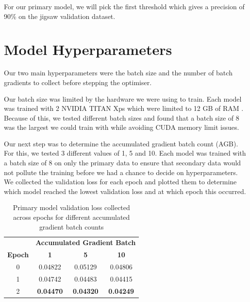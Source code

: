 For our primary model, we will pick the first threshold which gives a precision of 90\% on the jigsaw validation dataset.

\section{Model Hyperparameters}

Our two main hyperparameters were the batch size and the number of batch gradients to collect before stepping the optimiser.

Our batch size was limited by the hardware we were using to train. Each model was trained with 2 NVIDIA TITAN Xps which were limited to 12 GB of RAM \cite{nvidia-titan-xp}. Because of this, we tested different batch sizes and found that a batch size of 8 was the largest we could train with while avoiding CUDA memory limit issues.

Our next step was to determine the accumulated gradient batch count (AGB). For this, we tested 3 different values of 1, 5 and 10. Each model was trained with a batch size of 8 on only the primary data to ensure that secondary data would not pollute the training before we had a chance to decide on hyperparameters. We collected the validation loss for each epoch and plotted them to determine which model reached the lowest validation loss and at which epoch this occurred.

\begin{table}[ht]
    \centering
    \begin{tabular}{cccc}
        \toprule
        \multicolumn{1}{c}{}             & \multicolumn{3}{c}{\textbf{Accumulated Gradient Batch}}                                       \\
        \cmidrule{2-4}
        \multirow{-2}{*}{\textbf{Epoch}} & \textbf{1}                                              & \textbf{5}       & \textbf{10}      \\
        \midrule
        0                                & 0.04822                                                 & 0.05129          & 0.04806          \\
        1                                & 0.04742                                                 & 0.04483          & 0.04415          \\
        2                                & \textbf{0.04470}                                        & \textbf{0.04320} & \textbf{0.04249} \\
        \bottomrule
    \end{tabular}
    \vspace{5pt}
    \caption{Primary model validation loss collected across epochs for different accumulated gradient batch counts}
    \label{tab:agb_val_loss}
\end{table}

